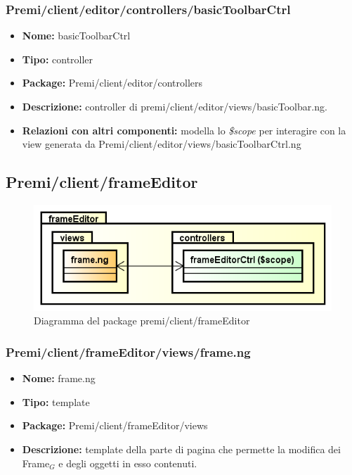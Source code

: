 \subsubsection{Premi/client/editor/controllers/basicToolbarCtrl}
\begin{itemize}
  \item[] \textbf{Nome:} basicToolbarCtrl
  \item[] \textbf{Tipo:} controller
  \item[] \textbf{Package:} Premi/client/editor/controllers
  \item[] \textbf{Descrizione:} controller di premi/client/editor/views/basicToolbar.ng.
  \item[] \textbf{Relazioni con altri componenti:} modella lo \textit{\$scope} per interagire con la view generata da Premi/client/editor/views/basicToolbarCtrl.ng
\end{itemize}


\subsection{Premi/client/frameEditor}
\begin{figure}[!h]
\begin{center}
\includegraphics[scale=0.45]{img/diapkg/frameEditor.png}
\caption{Diagramma del package premi/client/frameEditor}
\end{center}
\end{figure}
\subsubsection{Premi/client/frameEditor/views/frame.ng}
\begin{itemize}
  \item[] \textbf{Nome:} frame.ng
  \item[] \textbf{Tipo:} template
  \item[] \textbf{Package:} Premi/client/frameEditor/views
  \item[] \textbf{Descrizione:} template della parte di pagina che permette la modifica dei Frame$_G$ e degli oggetti in esso contenuti.
\end{itemize}
